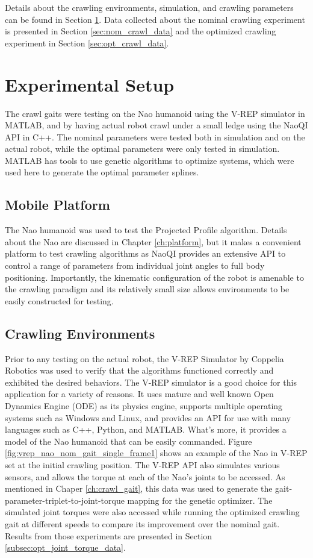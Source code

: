 Details about the crawling environments, simulation, and crawling parameters can be found in
Section \ref{sec:crawl_exp_setup}. Data collected about the nominal crawling experiment is
presented in Section \ref{sec:nom_crawl_data} and the optimized crawling experiment in 
Section \ref{sec:opt_crawl_data}.

\FloatBarrier
\section{Experimental Setup} \label{sec:crawl_exp_setup}
The crawl gaits were testing on the Nao humanoid using the V-REP simulator in MATLAB,
and by having actual robot crawl under a small ledge using the NaoQI API in C++.
The nominal parameters were tested both in simulation and on the actual robot, while
the optimal parameters were only tested in simulation. MATLAB has tools to use genetic
algorithms to optimize systems, which were used here to generate the optimal parameter
splines.

\subsection{Mobile Platform}
The Nao humanoid was used to test the Projected Profile algorithm.
Details about the Nao are discussed in Chapter \ref{ch:platform}, but it makes
a convenient platform to test crawling algorithms as NaoQI provides an extensive
API to control a range of parameters from individual joint angles to 
full body positioning. Importantly, the kinematic configuration of the robot is amenable 
to the crawling paradigm and its relatively small size allows environments to be
easily constructed for testing.

\subsection{Crawling Environments}
Prior to any testing on the actual robot, the V-REP Simulator by Coppelia Robotics was used
to verify that the algorithms functioned correctly and exhibited the desired behaviors.
The V-REP simulator is a good choice for this application for a variety of reasons.
It uses mature and well known Open Dynamics Engine (ODE) as its physics engine, supports multiple
operating systems such as Windows and Linux, and provides an API for use with many
languages such as C++, Python, and MATLAB. What's more, it provides a model of the Nao
humanoid that can be easily commanded.
Figure \ref{fig:vrep_nao_nom_gait_single_frame1} shows an example of the Nao in V-REP
set at the initial crawling position.
The V-REP API also simulates various sensors, and allows the torque at each of the Nao's
joints to be accessed. As mentioned in Chaper \ref{ch:crawl_gait}, this data was used
to generate the gait-parameter-triplet-to-joint-torque mapping for the genetic optimizer.
The simulated joint torques were also accessed while running the optimized crawling
gait at different speeds to compare its improvement over the nominal gait.
Results from those experiments are presented in Section \ref{subsec:opt_joint_torque_data}.

